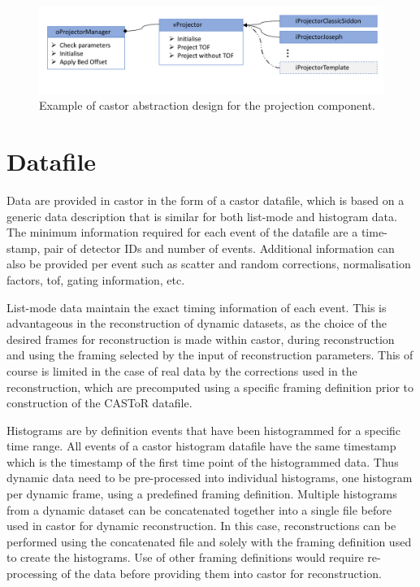\begin{figure} [h!]
\centering
\includegraphics[scale=0.50,angle=0]{2_Theory_Methods/figures/oProjectorManager.pdf}
\caption{Example of \gls{castor} abstraction design for the projection component.} 
\label{fig_2_4:oProjectorManager}
\end{figure}


\section{Datafile}
Data are provided in \gls{castor} in the form of a \gls{castor} datafile, which is based on a generic data description that is similar for both list-mode and histogram data. 
The minimum information required for each event of the datafile are a time-stamp, pair of detector IDs and number of events. Additional information can also be provided per event such as scatter and random corrections, normalisation factors, \gls{tof}, gating information, etc. 

List-mode data maintain the exact timing information of each event. This is advantageous in the reconstruction of dynamic datasets, as the choice of the desired frames for reconstruction is made within \gls{castor}, during reconstruction and using the framing selected by the input of reconstruction parameters. This of course is limited in the case of real data by the corrections used in the reconstruction, which are precomputed using a specific framing definition prior to construction of the CASToR datafile.

Histograms are by definition events that have been histogrammed for a specific time range. All events of a \gls{castor} histogram datafile have the same timestamp which is the timestamp of the first time point of the histogrammed data. Thus dynamic data need to be pre-processed into individual histograms, one histogram per dynamic frame, using a predefined framing definition.
Multiple histograms from a dynamic dataset can be concatenated together into a single file before used in \gls{castor} for dynamic reconstruction. In this case, reconstructions can be performed using the concatenated file and solely with the framing definition used to create the histograms. 
Use of other framing definitions would require re-processing of the data before providing them into \gls{castor} for reconstruction.

